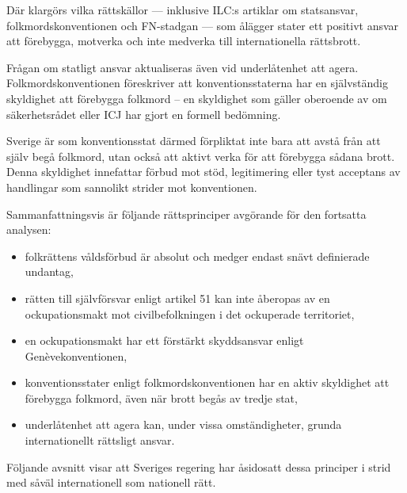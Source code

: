 Där klargörs vilka rättskällor — inklusive ILC:s artiklar om statsansvar, folkmordskonventionen och FN-stadgan — som ålägger stater ett positivt ansvar att förebygga, motverka och inte medverka till internationella rättsbrott.























Frågan om statligt ansvar aktualiseras även vid underlåtenhet att agera. 
Folkmordskonventionen föreskriver att konventionsstaterna har en självständig skyldighet 
att förebygga folkmord – en skyldighet som gäller oberoende av om säkerhetsrådet 
eller ICJ har gjort en formell bedömning.

Sverige är som konventionsstat därmed förpliktat inte bara att avstå från att själv begå folkmord, 
utan också att aktivt verka för att förebygga sådana brott. Denna skyldighet innefattar förbud mot stöd, 
legitimering eller tyst acceptans av handlingar som sannolikt strider mot konventionen.

\medskip

Sammanfattningsvis är följande rättsprinciper avgörande för den fortsatta analysen:

\begin{itemize}
  \item folkrättens våldsförbud är absolut och medger endast snävt definierade undantag,
  \item rätten till självförsvar enligt artikel 51 kan inte åberopas av en ockupationsmakt 
  mot civilbefolkningen i det ockuperade territoriet,
  \item en ockupationsmakt har ett förstärkt skyddsansvar enligt Genèvekonventionen,
  \item konventionsstater enligt folkmordskonventionen har en aktiv skyldighet att förebygga 
  folkmord, även när brott begås av tredje stat,
  \item underlåtenhet att agera kan, under vissa omständigheter, grunda internationellt rättsligt ansvar.
\end{itemize}

Följande avsnitt visar att Sveriges regering har åsidosatt dessa principer i strid med 
såväl internationell som nationell rätt.
